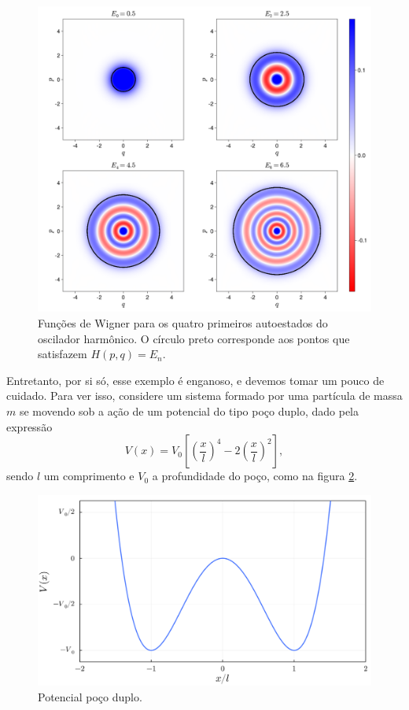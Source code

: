 \documentclass[
	12pt,
	oneside,			%
	a4paper,			%
	english,			%
	brazil				%
	]{abntex2}
\theoremstyle{definition}
\begin{document}
\begin{figure}[H]
    \includegraphics[width=\textwidth]{Imagens/wigner_harmonic_oscilator.png}
    \centering
    \caption{Funções de Wigner para os quatro primeiros autoestados do oscilador harmônico. O círculo preto corresponde aos pontos que satisfazem $H(p,q) = E_n$.}
    \label{autoestados oscilador}
\end{figure}

Entretanto, por si só, esse exemplo é enganoso, e devemos tomar um pouco de cuidado. Para ver isso, considere um sistema formado por uma partícula de massa $m$ se movendo sob a ação de um potencial do tipo poço duplo, dado pela expressão
\begin{equation}
    V(x) = V_0 \left[ \left( \frac{x}{l}\right)^4 - 2\left( \frac{x}{l}\right)^2\right],
\end{equation}
sendo $l$ um comprimento e $V_0$ a profundidade do poço, como na figura \ref{potencial poço duplo}. 

\begin{figure}[H]
    \includegraphics[width=.7\textwidth]{Imagens/double_well_potential.png}
    \centering
    \caption{Potencial poço duplo.}
    \label{potencial poço duplo}
\end{figure}
\end{document}
